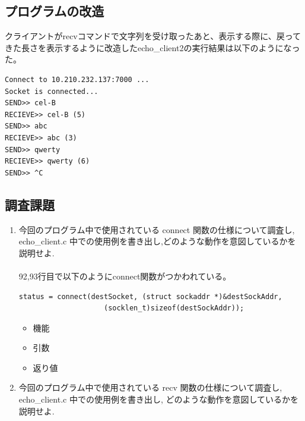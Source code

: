 \documentclass[a4j]{celb-report}
\begin{document}
\subsection{プログラムの改造}
クライアントがrecvコマンドで文字列を受け取ったあと、表示する際に、戻ってきた長さを表示するように改造したecho\_client2の実行結果は以下のようになった。
\begin{lstlisting}[basicstyle=\ttfamily\footnotesize, frame=single]
Connect to 10.210.232.137:7000 ...
Socket is connected...
SEND>> cel-B
RECIEVE>> cel-B (5)
SEND>> abc
RECIEVE>> abc (3)
SEND>> qwerty
RECIEVE>> qwerty (6)
SEND>> ^C
\end{lstlisting}

\subsection{調査課題}
\begin{enumerate}
 \renewcommand{\labelenumi}{(\arabic{enumi})}
 \item 今回のプログラム中で使用されている connect 関数の仕様について調査し, echo\_client.c 中での使用例を書き出し,どのような動作を意図しているかを説明せよ.\\
\\
92,93行目で以下のようにconnect関数がつかわれている。
  \begin{lstlisting}[basicstyle=\ttfamily\footnotesize, frame=single]
    status = connect(destSocket, (struct sockaddr *)&destSockAddr, 
                    (socklen_t)sizeof(destSockAddr));
  \end{lstlisting}
  \begin{itemize}
   \item 機能
   \item 引数
   \item 返り値
  \end{itemize}
 \item 今回のプログラム中で使用されている recv 関数の仕様について調査し, echo\_client.c 中での使用例を書き出し, どのような動作を意図しているかを説明せよ.
\end{enumerate}
\end{document}
